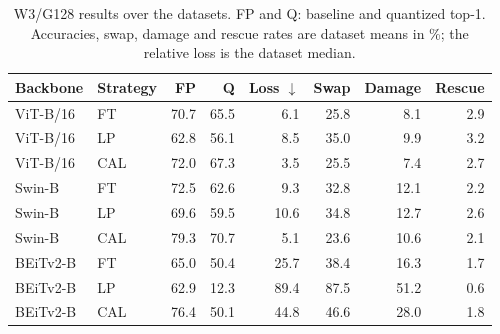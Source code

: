 \begin{table}[t]
\centering
\caption{W3/G128 results over the {} datasets. FP and Q: baseline and quantized top-1. Accuracies, swap, damage and rescue rates are dataset means in \%; the relative loss is the dataset median.}
\label{tab:w3}
\setlength{\tabcolsep}{2.2pt}
\small
\begin{tabular}{llrrrrrr}
\toprule
Backbone & Strategy & FP & Q & Loss $\downarrow$ & Swap & Damage & Rescue \\
\midrule
ViT-B/16 & FT & 70.7 & 65.5 & 6.1 & 25.8 & 8.1 & 2.9 \\
ViT-B/16 & LP & 62.8 & 56.1 & 8.5 & 35.0 & 9.9 & 3.2 \\
ViT-B/16 & CAL & 72.0 & 67.3 & 3.5 & 25.5 & 7.4 & 2.7 \\
Swin-B & FT & 72.5 & 62.6 & 9.3 & 32.8 & 12.1 & 2.2 \\
Swin-B & LP & 69.6 & 59.5 & 10.6 & 34.8 & 12.7 & 2.6 \\
Swin-B & CAL & 79.3 & 70.7 & 5.1 & 23.6 & 10.6 & 2.1 \\
BEiTv2-B & FT & 65.0 & 50.4 & 25.7 & 38.4 & 16.3 & 1.7 \\
BEiTv2-B & LP & 62.9 & 12.3 & 89.4 & 87.5 & 51.2 & 0.6 \\
BEiTv2-B & CAL & 76.4 & 50.1 & 44.8 & 46.6 & 28.0 & 1.8 \\
\bottomrule
\end{tabular}
\end{table}
